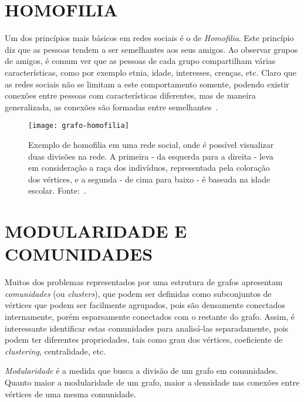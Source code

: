 \section{\texorpdfstring{\MakeUppercase{Homofilia}}{}}
\label{conceitos__homofilia}

Um dos princípios mais básicos em redes sociais é o de \emph{Homofilia}. Este princípio diz que as pessoas tendem a ser semelhantes aos seus amigos. Ao observar grupos de amigos, é comum ver que as pessoas de cada grupo compartilham várias características, como por exemplo etnia, idade, interesses, crenças, etc. Claro que as redes sociais não se limitam a este comportamento somente, podendo existir conexões entre pessoas com características diferentes, mas de maneira generalizada, as conexões são formadas entre semelhantes~\cite{easley2010networks}.

\begin{figure}[H]
\texttt{[image: grafo-homofilia]}
\centering
\caption{
     Exemplo de homofilia em uma rede social, onde é possível visualizar duas divisões na rede. A primeira - da esquerda para a direita - leva em consideração a raça dos indivíduos, representada pela coloração dos vértices, e a segunda - de cima para baixo - é baseada na idade escolar. Fonte:~\cite{moody2001race}.
}
\label{fig:grafo-homofilia}
\end{figure}

\section{\texorpdfstring{\MakeUppercase{Modularidade e Comunidades}}{}}
\label{conceitos__modularidade}

Muitos dos problemas representados por uma estrutura de grafos apresentam \emph{comunidades} (ou \emph{clusters}), que podem ser definidas como subconjuntos de vértices que podem ser facilmente agrupados, pois são densamente conectados internamente, porém esparsamente conectados com o restante do grafo. Assim, é interessante identificar estas comunidades para analisá-las separadamente, pois podem ter diferentes propriedades, tais como grau dos vértices, coeficiente de \emph{clustering}, centralidade, etc. 

\emph{Modularidade} é a medida que busca a divisão de um grafo em comunidades. Quanto maior a modularidade de um grafo, maior a densidade nas conexões entre vértices de uma mesma comunidade.

